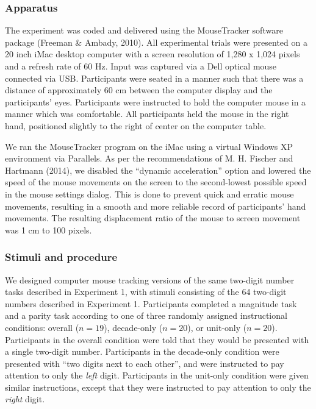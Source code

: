 \documentclass[english,man]{apa6}
\theoremstyle{definition}
\theoremstyle{definition}
\theoremstyle{definition}
\theoremstyle{remark}
\begin{document}
\subsubsection{Apparatus}\label{apparatus}

The experiment was coded and delivered using the MouseTracker software
package (Freeman \& Ambady, 2010). All experimental trials were
presented on a 20 inch iMac desktop computer with a screen resolution of
1,280 x 1,024 pixels and a refresh rate of 60 Hz. Input was captured via
a Dell optical mouse connected via USB. Participants were seated in a
manner such that there was a distance of approximately 60 cm between the
computer display and the participants' eyes. Participants were
instructed to hold the computer mouse in a manner which was comfortable.
All participants held the mouse in the right hand, positioned slightly
to the right of center on the computer table.

We ran the MouseTracker program on the iMac using a virtual Windows XP
environment via Parallels. As per the recommendations of M. H. Fischer
and Hartmann (2014), we disabled the \enquote{dynamic acceleration}
option and lowered the speed of the mouse movements on the screen to the
second-lowest possible speed in the mouse settings dialog. This is done
to prevent quick and erratic mouse movements, resulting in a smooth and
more reliable record of participants' hand movements. The resulting
displacement ratio of the mouse to screen movement was 1 cm to 100
pixels.

\subsubsection{Stimuli and procedure}\label{stimuli-and-procedure}

We designed computer mouse tracking versions of the same two-digit
number tasks described in Experiment 1, with stimuli consisting of the
64 two-digit numbers described in Experiment 1. Participants completed a
magnitude task and a parity task according to one of three randomly
assigned instructional conditions: overall (\(n=19\)), decade-only
(\(n=20\)), or unit-only (\(n=20\)). Participants in the overall
condition were told that they would be presented with a single two-digit
number. Participants in the decade-only condition were presented with
\enquote{two digits next to each other}, and were instructed to pay
attention to only the \emph{left} digit. Participants in the unit-only
condition were given similar instructions, except that they were
instructed to pay attention to only the \emph{right} digit.
\end{document}
